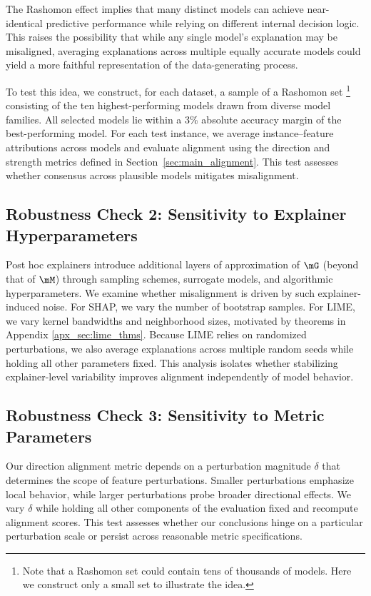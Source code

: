 \documentclass[11pt]{article}
\begin{document}
The Rashomon effect implies that many distinct models can achieve near-identical predictive performance while relying on different internal decision logic. This raises the possibility that while any single model’s explanation may be misaligned, averaging explanations across multiple equally accurate models could yield a more faithful representation of the data-generating process.

To test this idea, we construct, for each dataset, a sample of a Rashomon set \footnote{Note that a Rashomon set could contain tens of thousands of models. Here we construct only a small set to illustrate the idea.} consisting of the ten highest-performing models drawn from diverse model families. All selected models lie within a 3\% absolute accuracy margin of the best-performing model. For each test instance, we average instance–feature attributions across models and evaluate alignment using the direction and strength metrics defined in Section~\ref{sec:main_alignment}. This test assesses whether consensus across plausible models mitigates misalignment.

\subsection*{Robustness Check 2: Sensitivity to Explainer Hyperparameters}
\label{sec:lime_params}

Post hoc explainers introduce additional layers of approximation of $\mG$ (beyond that of $\mM$) through sampling schemes, surrogate models, and algorithmic hyperparameters. We examine whether misalignment is driven by such explainer-induced noise.
For SHAP, we vary the number of bootstrap samples. For LIME, we vary kernel bandwidths and neighborhood sizes, motivated by theorems in Appendix \ref{apx_sec:lime_thms}. Because LIME relies on randomized perturbations, we also average explanations across multiple random seeds while holding all other parameters fixed. This analysis isolates whether stabilizing explainer-level variability improves alignment independently of model behavior.

\subsection*{Robustness Check 3: Sensitivity to Metric Parameters}

Our direction alignment metric depends on a perturbation magnitude $\delta$ that determines the scope of feature perturbations. Smaller perturbations emphasize local behavior, while larger perturbations probe broader directional effects. We vary $\delta$ while holding all other components of the evaluation fixed and recompute alignment scores. This test assesses whether our conclusions hinge on a particular perturbation scale or persist across reasonable metric specifications.
\end{document}

